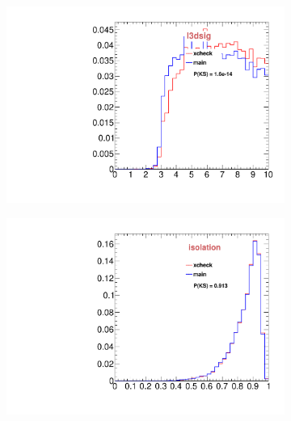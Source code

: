 \begin{figure}
\begin{subfigure}[b]{0.2\textwidth}
                \includegraphics[width=\textwidth]{Figures/VariablesComparison/MC_barrel_figs/fls3d}
                \label{fig:MC_barrel_fls3d}
        \end{subfigure}
        \begin{subfigure}[b]{0.2\textwidth}
                \centering
                \includegraphics[width=\textwidth]{Figures/VariablesComparison/MC_barrel_figs/iso}
                \label{fig:MC_barrel_iso}
        \end{subfigure}
        \begin{subfigure}[b]{0.2\textwidth}
                \centering

\end{subfigure}
\end{figure}
